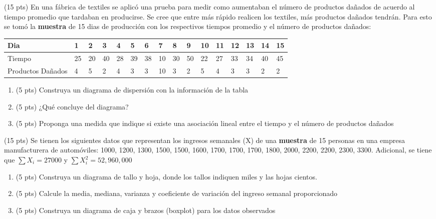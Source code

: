 \documentclass[addpoints]{exam}
\theoremstyle{mytheor}
\begin{document}
\begin{questions}

\question (15 pts) En una fábrica de textiles se aplicó una prueba para medir como aumentaban el número de productos dañados de acuerdo al tiempo promedio que tardaban en producirse. Se cree que entre más rápido realicen los textiles, más productos dañados tendrán. Para esto se tomó la \textbf{muestra} de 15 dias de producción con los respectivos tiempos promedio y el número de productos dañados:

\begin{table}[h]
\centering
\begin{tabular}{llllllllllllllll}
Dia & 1 & 2 & 3 & 4 & 5 & 6 & 7 & 8 & 9 & 10 & 11 & 12 & 13 & 14 & 15 \\ \hline
Tiempo & 25 & 20 & 40 & 28 & 39 & 38 & 10 & 30 & 50 & 22 & 27 & 33 & 34 & 40 & 45 \\
Productos Dañados & 4 & 5 & 2 & 4 & 3 & 3 & 10 & 3 & 2 & 5 & 4 & 3 & 3 & 2 & 2
\end{tabular}
\end{table}

\begin{enumerate}
  \item (5 pts) Construya un diagrama de dispersión con la información de la tabla
  \item (5 pts) ¿Qué concluye del diagrama?
  \item (5 pts) Proponga una medida que indique si existe una asociación lineal entre el tiempo y el número de productos dañados
  \end{enumerate}

 \question (15 pts) Se tienen los siguientes datos que representan los ingresos semanales (X) de una \textbf{muestra} de 15 personas en una empresa manufacturera de automóviles: 1000, 1200, 1300, 1500, 1500, 1600, 1700, 1700, 1700, 1800, 2000, 2200, 2200, 2300, 3300. Adicional, se tiene que $\sum{X_i} = 27000$ y $\sum{X_i^2} = 52,960,000$
 

  \begin{enumerate}
  \item (5 pts) Construya un diagrama de tallo y hoja, donde los tallos indiquen miles y las hojas cientos. 
  \item (5 pts) Calcule la media, mediana, varianza y coeficiente de variación del ingreso semanal proporcionado
  \item (5 pts) Construya un diagrama de caja y brazos (boxplot) para los datos observados
  \end{enumerate}
   
\end{questions} 
\end{document}
